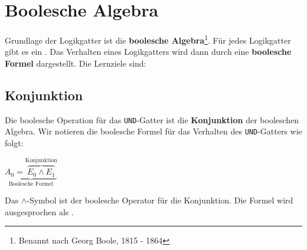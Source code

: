 
\toggletrue{image}
\togglefalse{imagehover}
\toggletrue{imagehover}

\chapter{Boolesche Algebra}
\label{ch:boolesche-algebra}

Grundlage der Logikgatter ist die \textbf{boolesche Algebra}\footnote{Benannt nach Georg Boole, 1815 - 1864}. Für jedes Logikgatter gibt es ein . Das Verhalten eines Logikgatters wird dann durch eine \textbf{boolesche Formel} dargestellt. Die Lernziele sind:\\


\vspace{-0.25cm}

\section{Konjunktion}

Die boolesche Operation für das \texttt{UND}-Gatter ist die \textbf{Konjunktion} der booleschen Algebra. Wir notieren die boolesche Formel für das Verhalten des \texttt{UND}-Gatters wie folgt:

\begin{center}
\Large
$\underbrace{A_0 = \overbrace{E_0 \wedge E_1}^{\text{Konjunktion}}}_{\text{Boolesche Formel}}$
\end{center}

Das $\wedge$-Symbol ist der boolesche Operator für die Konjunktion. Die Formel wird ausgesprochen als .


